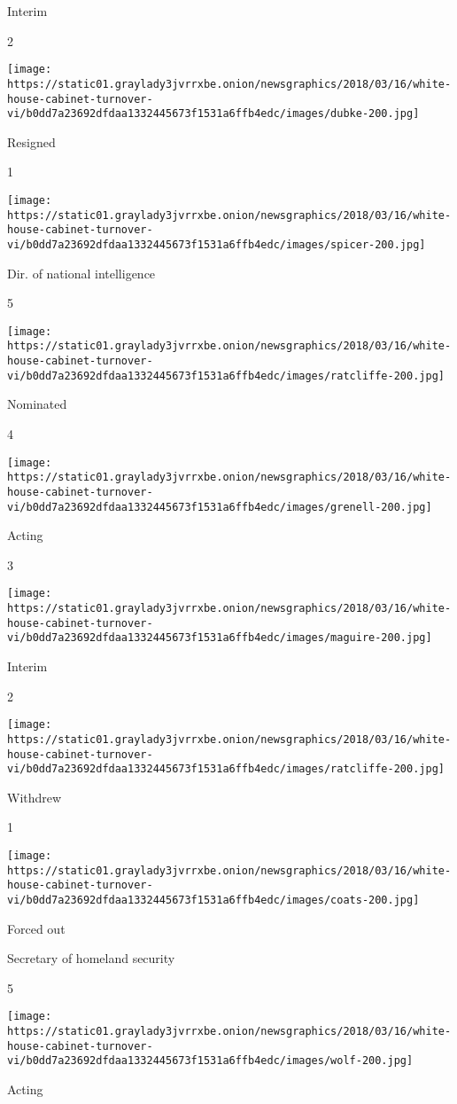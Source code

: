 Interim

2

\texttt{[image: https://static01.graylady3jvrrxbe.onion/newsgraphics/2018/03/16/white-house-cabinet-turnover-vi/b0dd7a23692dfdaa1332445673f1531a6ffb4edc/images/dubke-200.jpg]}

Resigned

1

\texttt{[image: https://static01.graylady3jvrrxbe.onion/newsgraphics/2018/03/16/white-house-cabinet-turnover-vi/b0dd7a23692dfdaa1332445673f1531a6ffb4edc/images/spicer-200.jpg]}

Dir. of national intelligence

5

\texttt{[image: https://static01.graylady3jvrrxbe.onion/newsgraphics/2018/03/16/white-house-cabinet-turnover-vi/b0dd7a23692dfdaa1332445673f1531a6ffb4edc/images/ratcliffe-200.jpg]}

Nominated

4

\texttt{[image: https://static01.graylady3jvrrxbe.onion/newsgraphics/2018/03/16/white-house-cabinet-turnover-vi/b0dd7a23692dfdaa1332445673f1531a6ffb4edc/images/grenell-200.jpg]}

Acting

3

\texttt{[image: https://static01.graylady3jvrrxbe.onion/newsgraphics/2018/03/16/white-house-cabinet-turnover-vi/b0dd7a23692dfdaa1332445673f1531a6ffb4edc/images/maguire-200.jpg]}

Interim

2

\texttt{[image: https://static01.graylady3jvrrxbe.onion/newsgraphics/2018/03/16/white-house-cabinet-turnover-vi/b0dd7a23692dfdaa1332445673f1531a6ffb4edc/images/ratcliffe-200.jpg]}

Withdrew

1

\texttt{[image: https://static01.graylady3jvrrxbe.onion/newsgraphics/2018/03/16/white-house-cabinet-turnover-vi/b0dd7a23692dfdaa1332445673f1531a6ffb4edc/images/coats-200.jpg]}

Forced out

Secretary of homeland security

5

\texttt{[image: https://static01.graylady3jvrrxbe.onion/newsgraphics/2018/03/16/white-house-cabinet-turnover-vi/b0dd7a23692dfdaa1332445673f1531a6ffb4edc/images/wolf-200.jpg]}

Acting

